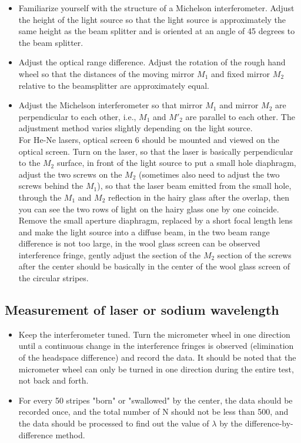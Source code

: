 \documentclass[UTF8]{article}
\begin{document}
 \begin{itemize}
	\item Familiarize yourself with the structure of a Michelson interferometer. Adjust the height of the light source so that the light source is approximately the same height as the beam splitter and is oriented at an angle of 45 degrees to the beam splitter.
	\item Adjust the optical range difference. Adjust the rotation of the rough hand wheel so that the distances of the moving mirror $M_1$ and fixed mirror $M_2$ relative to the beamsplitter are approximately equal.
	\item Adjust the Michelson interferometer so that mirror $M_1$ and mirror $M_2$ are perpendicular to each other, i.e., $M_1$ and $M'_2$ are parallel to each other. The adjustment method varies slightly depending on the light source.\\
 For He-Ne lasers, optical screen 6 should be mounted and viewed on the optical screen. Turn on the laser, so that the laser is basically perpendicular to the $M_2$ surface, in front of the light source to put a small hole diaphragm, adjust the two screws on the $M_2$ (sometimes also need to adjust the two screws behind the $M_1$), so that the laser beam emitted from the small hole, through the $M_1$ and $M_2$ reflection in the hairy glass after the overlap, then you can see the two rows of light on the hairy glass one by one coincide. Remove the small aperture diaphragm, replaced by a short focal length lens and make the light source into a diffuse beam, in the two beam range difference is not too large, in the wool glass screen can be observed interference fringe, gently adjust the section of the $M_2$ section of the screws after the center should be basically in the center of the wool glass screen of the circular stripes.
	\end{itemize}


    \subsection{Measurement of laser or sodium wavelength}
   \begin{itemize}
	\item Keep the interferometer tuned. Turn the micrometer wheel in one direction until a continuous change in the interference fringes is observed (elimination of the headspace difference) and record the data. It should be noted that the micrometer wheel can only be turned in one direction during the entire test, not back and forth.
	\item For every 50 stripes "born" or "swallowed" by the center, the data should be recorded once, and the total number of N should not be less than 500, and the data should be processed to find out the value of $\lambda$ by the difference-by-difference method.
\end{itemize}
\end{document}
